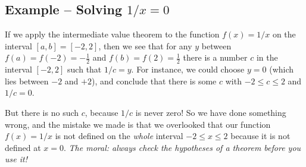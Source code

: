 \subsection{Example -- Solving $1/x=0$}
If we apply the intermediate value theorem to the function $f(x) =
1/x$ on the interval $[a,b] = [-2, 2]$, then we see that for any $y$
between $f(a) = f(-2) = -\frac12$ and $f(b) = f(2) = \frac12$ there is
a number $c$ in the interval $[-2, 2]$ such that $1/c = y$.  For
instance, we could choose $y=0$ (which lies between $-2$ and $+2$), and
conclude that there is some $c$ with $-2\leq c\leq 2$ and $1/c = 0$.

But there is no such $c$, because $1/c$ is never zero!  So we have done
something wrong, and the mistake we made is that we overlooked that our function
$f(x) = 1/x$ is not defined on the \emph{whole} interval $-2\leq x\leq 2$
because it is not defined at $x=0$.  \textit{The moral: always check the
  hypotheses of a theorem before you use it!}
\marginpar{\footnotesize\sffamily%
}


